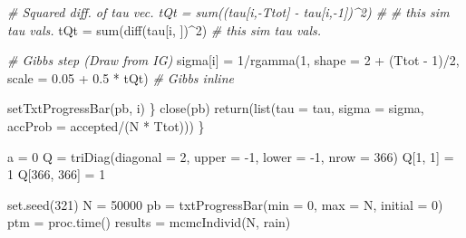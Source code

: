 \documentclass[
]{article}
\newenvironment{Shaded}{\begin{snugshade}}{\end{snugshade}}
\newcommand{\AttributeTok}[1]{\textcolor[rgb]{0.77,0.63,0.00}{#1}}
\newcommand{\CommentTok}[1]{\textcolor[rgb]{0.56,0.35,0.01}{\textit{#1}}}
\newcommand{\DecValTok}[1]{\textcolor[rgb]{0.00,0.00,0.81}{#1}}
\newcommand{\FloatTok}[1]{\textcolor[rgb]{0.00,0.00,0.81}{#1}}
\newcommand{\FunctionTok}[1]{\textcolor[rgb]{0.00,0.00,0.00}{#1}}
\newcommand{\NormalTok}[1]{#1}
\newcommand{\OtherTok}[1]{\textcolor[rgb]{0.56,0.35,0.01}{#1}}
\newcommand{\SpecialCharTok}[1]{\textcolor[rgb]{0.00,0.00,0.00}{#1}}
\begin{document}
\begin{Shaded}
\begin{Highlighting}[]
        \CommentTok{\# Squared diff. of tau vec.  tQt = sum((tau[i,{-}Ttot] {-} tau[i,{-}1])\^{}2) \#}
        \CommentTok{\# this sim tau vals.}
\NormalTok{        tQt }\OtherTok{=} \FunctionTok{sum}\NormalTok{(}\FunctionTok{diff}\NormalTok{(tau[i, ])}\SpecialCharTok{\^{}}\DecValTok{2}\NormalTok{)  }\CommentTok{\# this sim tau vals.}

        \CommentTok{\# Gibbs step (Draw from IG)}
\NormalTok{        sigma[i] }\OtherTok{=} \DecValTok{1}\SpecialCharTok{/}\FunctionTok{rgamma}\NormalTok{(}\DecValTok{1}\NormalTok{, }\AttributeTok{shape =} \DecValTok{2} \SpecialCharTok{+}\NormalTok{ (Ttot }\SpecialCharTok{{-}} \DecValTok{1}\NormalTok{)}\SpecialCharTok{/}\DecValTok{2}\NormalTok{, }\AttributeTok{scale =} \FloatTok{0.05} \SpecialCharTok{+} \FloatTok{0.5} \SpecialCharTok{*}\NormalTok{ tQt)  }\CommentTok{\# Gibbs inline}

        \FunctionTok{setTxtProgressBar}\NormalTok{(pb, i)}
\NormalTok{    \}}
    \FunctionTok{close}\NormalTok{(pb)}
    \FunctionTok{return}\NormalTok{(}\FunctionTok{list}\NormalTok{(}\AttributeTok{tau =}\NormalTok{ tau, }\AttributeTok{sigma =}\NormalTok{ sigma, }\AttributeTok{accProb =}\NormalTok{ accepted}\SpecialCharTok{/}\NormalTok{(N }\SpecialCharTok{*}\NormalTok{ Ttot)))}
\NormalTok{\}}
\end{Highlighting}
\end{Shaded}

\begin{Shaded}
\begin{Highlighting}[]
\NormalTok{a }\OtherTok{=} \DecValTok{0}
\NormalTok{Q }\OtherTok{=} \FunctionTok{triDiag}\NormalTok{(}\AttributeTok{diagonal =} \DecValTok{2}\NormalTok{, }\AttributeTok{upper =} \SpecialCharTok{{-}}\DecValTok{1}\NormalTok{, }\AttributeTok{lower =} \SpecialCharTok{{-}}\DecValTok{1}\NormalTok{, }\AttributeTok{nrow =} \DecValTok{366}\NormalTok{)}
\NormalTok{Q[}\DecValTok{1}\NormalTok{, }\DecValTok{1}\NormalTok{] }\OtherTok{=} \DecValTok{1}
\NormalTok{Q[}\DecValTok{366}\NormalTok{, }\DecValTok{366}\NormalTok{] }\OtherTok{=} \DecValTok{1}

\FunctionTok{set.seed}\NormalTok{(}\DecValTok{321}\NormalTok{)}
\NormalTok{N }\OtherTok{=} \DecValTok{50000}
\NormalTok{pb }\OtherTok{=} \FunctionTok{txtProgressBar}\NormalTok{(}\AttributeTok{min =} \DecValTok{0}\NormalTok{, }\AttributeTok{max =}\NormalTok{ N, }\AttributeTok{initial =} \DecValTok{0}\NormalTok{)}
\NormalTok{ptm }\OtherTok{=} \FunctionTok{proc.time}\NormalTok{()}
\NormalTok{results }\OtherTok{=} \FunctionTok{mcmcIndivid}\NormalTok{(N, rain)}
\end{Highlighting}
\end{Shaded}
\end{document}
